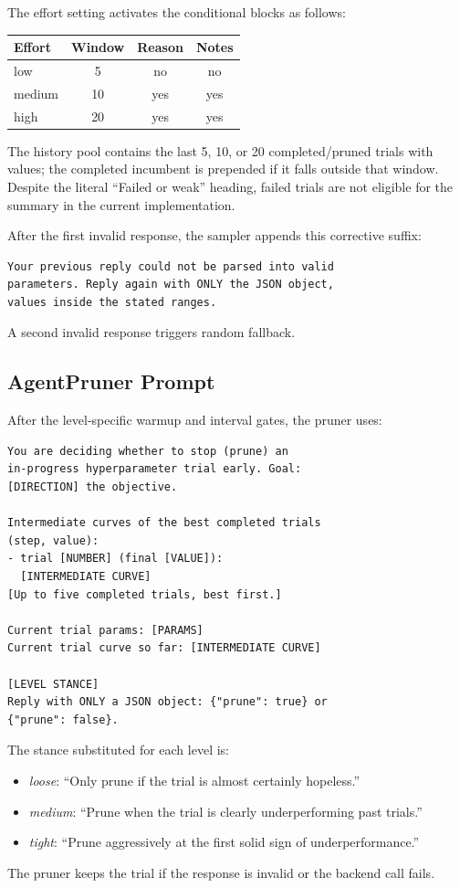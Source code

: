 \documentclass[letterpaper]{article}
\begin{document}
The effort setting activates the conditional blocks as follows:
\begin{center}
\begin{tabular}{lccc}
\toprule
Effort & Window & Reason & Notes \\
\midrule
low & 5 & no & no \\
medium & 10 & yes & yes \\
high & 20 & yes & yes \\
\bottomrule
\end{tabular}
\end{center}
The history pool contains the last 5, 10, or 20 completed/pruned trials with
values; the completed incumbent is prepended if it falls outside that window.
Despite the literal ``Failed or weak'' heading, failed trials are not eligible
for the summary in the current implementation.

After the first invalid response, the sampler appends this corrective suffix:

\begin{scriptsize}
\begin{verbatim}
Your previous reply could not be parsed into valid
parameters. Reply again with ONLY the JSON object,
values inside the stated ranges.
\end{verbatim}
\end{scriptsize}

A second invalid response triggers random fallback.

\subsection{AgentPruner Prompt}

After the level-specific warmup and interval gates, the pruner uses:

\begin{scriptsize}
\begin{verbatim}
You are deciding whether to stop (prune) an
in-progress hyperparameter trial early. Goal:
[DIRECTION] the objective.

Intermediate curves of the best completed trials
(step, value):
- trial [NUMBER] (final [VALUE]):
  [INTERMEDIATE CURVE]
[Up to five completed trials, best first.]

Current trial params: [PARAMS]
Current trial curve so far: [INTERMEDIATE CURVE]

[LEVEL STANCE]
Reply with ONLY a JSON object: {"prune": true} or
{"prune": false}.
\end{verbatim}
\end{scriptsize}

The stance substituted for each level is:
\begin{itemize}
\item \emph{loose}: ``Only prune if the trial is almost certainly hopeless.''
\item \emph{medium}: ``Prune when the trial is clearly underperforming past trials.''
\item \emph{tight}: ``Prune aggressively at the first solid sign of underperformance.''
\end{itemize}
The pruner keeps the trial if the response is invalid or the backend call fails.
\end{document}
